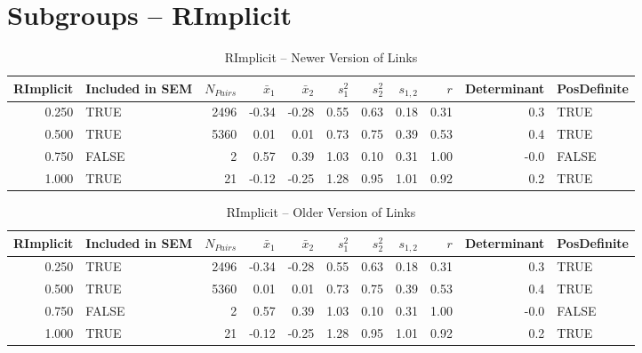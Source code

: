 \documentclass{article}\usepackage[]{graphicx}\usepackage[]{color}
\begin{document}
\section{Subgroups --  RImplicit }%
\begin{table}[ht]
\centering
\begin{tabular}{rlrrrrrrrrl}
  \hline
RImplicit & Included in SEM & $N_{Pairs}$ & $\bar{x}_1$ & $\bar{x}_2$ & $s_1^2$ & $s_2^2$ & $s_{1,2}$ & $r$ & Determinant & PosDefinite \\ 
  \hline
0.250 & TRUE & 2496 & -0.34 & -0.28 & 0.55 & 0.63 & 0.18 & 0.31 & 0.3 & TRUE \\ 
  0.500 & TRUE & 5360 & 0.01 & 0.01 & 0.73 & 0.75 & 0.39 & 0.53 & 0.4 & TRUE \\ 
  0.750 & FALSE & 2 & 0.57 & 0.39 & 1.03 & 0.10 & 0.31 & 1.00 & -0.0 & FALSE \\ 
  1.000 & TRUE & 21 & -0.12 & -0.25 & 1.28 & 0.95 & 1.01 & 0.92 & 0.2 & TRUE \\ 
   \hline
\end{tabular}
\caption{RImplicit -- Newer Version of Links} 
\end{table}
\begin{table}[ht]
\centering
\begin{tabular}{rlrrrrrrrrl}
  \hline
RImplicit & Included in SEM & $N_{Pairs}$ & $\bar{x}_1$ & $\bar{x}_2$ & $s_1^2$ & $s_2^2$ & $s_{1,2}$ & $r$ & Determinant & PosDefinite \\ 
  \hline
0.250 & TRUE & 2496 & -0.34 & -0.28 & 0.55 & 0.63 & 0.18 & 0.31 & 0.3 & TRUE \\ 
  0.500 & TRUE & 5360 & 0.01 & 0.01 & 0.73 & 0.75 & 0.39 & 0.53 & 0.4 & TRUE \\ 
  0.750 & FALSE & 2 & 0.57 & 0.39 & 1.03 & 0.10 & 0.31 & 1.00 & -0.0 & FALSE \\ 
  1.000 & TRUE & 21 & -0.12 & -0.25 & 1.28 & 0.95 & 1.01 & 0.92 & 0.2 & TRUE \\ 
   \hline
\end{tabular}
\caption{RImplicit -- Older Version of Links} 
\end{table}
\end{document}

